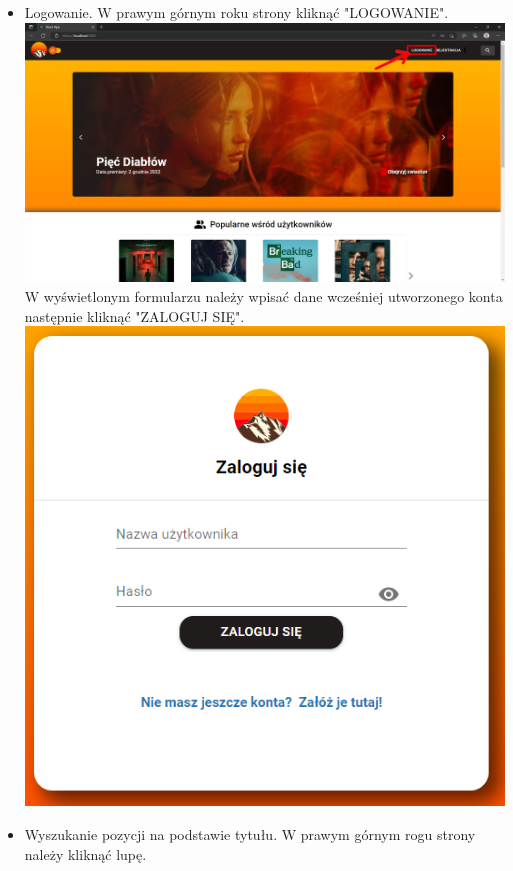 \documentclass[12pt]{article}
\begin{document}
\begin{flushleft}
\begin{itemize}
			
			\item Logowanie. \linebreak
			W prawym górnym roku strony kliknąć "LOGOWANIE". \linebreak
			\includegraphics[scale=0.3]{Logowanie1.png} \linebreak
			W wyświetlonym formularzu należy wpisać dane wcześniej utworzonego konta następnie kliknąć "ZALOGUJ SIĘ". \linebreak
			\includegraphics[scale=0.7]{Logowanie2.png} \linebreak
			\item Wyszukanie pozycji na podstawie tytułu.
			W prawym górnym rogu strony należy kliknąć lupę.\linebreak

\end{itemize}
\end{flushleft}
\end{document}
